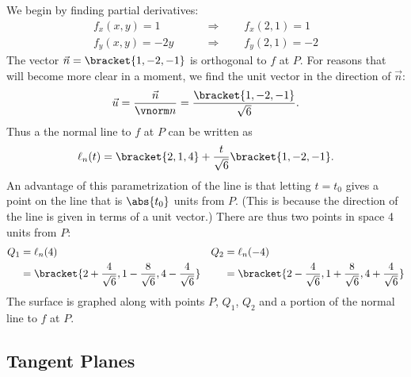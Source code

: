 {We begin by finding partial derivatives:
\begin{align*}
f_x(x,y)  =1  \qquad &\Rightarrow \qquad f_x(2,1) = 1\\
f_y(x,y) = -2y \qquad &\Rightarrow \qquad  f_y(2,1) = -2
\end{align*}
The vector $\vec n=\bracket{1,-2,-1}$ is orthogonal to $f$ at $P$. For reasons that will become more clear in a moment, we find the unit vector in the direction of $\vec n$:
$$\vec u = \frac{\vec n}{\vnorm n}=\frac{\bracket{1,-2,-1}}{\sqrt6} %
.$$
Thus a the normal line to $f$ at $P$ can be written as
$$\ell_n(t) =\bracket{2,1,4}+\frac t{\sqrt6}\bracket{1,-2,-1}%
.$$
An advantage of this parametrization of the line is that letting $t=t_0$ gives a point on the line that is $\abs{t_0}$ units from $P$. (This is because the direction of the line is given in terms of a unit vector.) There are thus two points in space 4 units from $P$:
\begin{align*}
Q_1 &= \ell_n(4) & Q_2 &= \ell_n(-4) \\
  &=\bracket{2+\frac4{\sqrt6},1-\frac8{\sqrt6},4-\frac4{\sqrt6}}
  & & =\bracket{2-\frac4{\sqrt6},1+\frac8{\sqrt6},4+\frac4{\sqrt6}}
	\end{align*}
The surface is graphed along with points $P$, $Q_1$, $Q_2$ and a portion of the normal line to $f$ at $P$.}

\subsection*{Tangent Planes}

